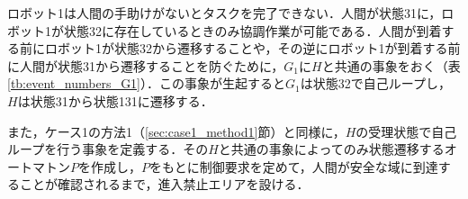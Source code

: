 ロボット1は人間の手助けがないとタスクを完了できない．人間が状態31に，ロボット1が状態32に存在しているときのみ協調作業が可能である．人間が到着する前にロボット1が状態32から遷移することや，その逆にロボット1が到着する前に人間が状態31から遷移することを防ぐために，$G_1$に$H$と共通の事象をおく（表\ref{tb:event_numbers_G1}）．この事象が生起すると$G_1$は状態32で自己ループし，$H$は状態31から状態131に遷移する．

また，ケース1の方法1（\ref{sec:case1_method1}節）と同様に，$H$の受理状態で自己ループを行う事象を定義する．その$H$と共通の事象によってのみ状態遷移するオートマトン$P$を作成し，$P$をもとに制御要求を定めて，人間が安全な域に到達することが確認されるまで，進入禁止エリアを設ける．

